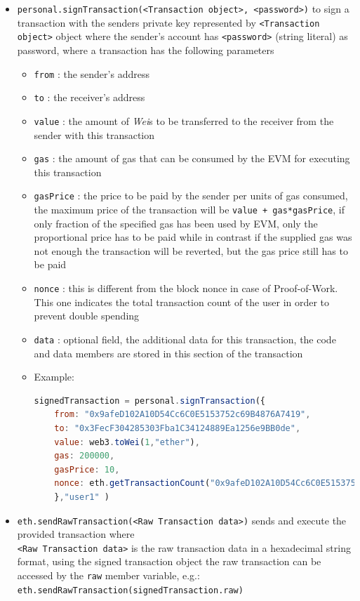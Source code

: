 \documentclass[a4paper]{article}
\begin{document}
\begin{itemize}
\item \verb!personal.signTransaction(<Transaction object>, <password>)! to sign a transaction with the senders private key represented by \verb!<Transaction object>! object where the sender's account has \verb!<password>! (string literal) as password, where a transaction has the following parameters

\begin{itemize}

\item \verb!from! : the sender's address

\item \verb!to! : the receiver's address

\item \verb!value! : the amount of \emph{Wei}s to be transferred to the receiver from the sender with this transaction

\item \verb!gas! : the amount of gas that can be consumed by the EVM for executing this transaction

\item \verb!gasPrice! : the price to be paid by the sender per units of gas consumed, the maximum price of the transaction will be \verb!value + gas*gasPrice!, if only fraction of the specified gas has been used by EVM, only the proportional price has to be paid while in contrast if the supplied gas was not enough the transaction will be reverted, but the gas price still has to be paid

\item \verb!nonce! : this is different from the block nonce in case of Proof-of-Work. This one indicates the total transaction count of the user in order to prevent double spending

\item \verb!data! : optional field, the additional data for this transaction, the code and data members are stored in this section of the transaction

\item Example:
\begin{lstlisting}[language=javascript]
signedTransaction = personal.signTransaction({
    from: "0x9afeD102A10D54Cc6C0E5153752c69B4876A7419",
    to: "0x3FecF304285303Fba1C34124889Ea1256e9BB0de",
    value: web3.toWei(1,"ether"),
    gas: 200000, 
    gasPrice: 10,
    nonce: eth.getTransactionCount("0x9afeD102A10D54Cc6C0E5153752c69B4876A7419")
    },"user1" )
\end{lstlisting}

\end{itemize}

\item \verb!eth.sendRawTransaction(<Raw Transaction data>)! sends and execute the  provided transaction where \\ \verb!<Raw Transaction data>! is the raw transaction data in a hexadecimal string format, using the signed transaction object the raw transaction can be accessed by the \verb!raw! member variable, e.g.: \\ \verb!eth.sendRawTransaction(signedTransaction.raw)!

\end{itemize}
\end{document}
